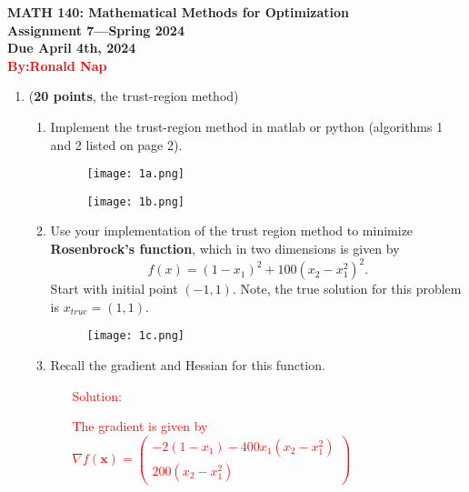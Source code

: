 \documentclass[11pt]{article}
\begin{document}
\pagestyle{empty}

\begin{center}
{\large {\bf MATH 140: Mathematical Methods for Optimization}}\\
{\bf Assignment 7---Spring 2024}\\
{\bf Due April 4th, 2024} \\
{\textcolor{red}{\bf By:Ronald Nap}}

\end{center}

\begin{enumerate}

\item ({\bf 20 points}, the trust-region method)
  \begin{enumerate}
  \item Implement the trust-region method in matlab or python
    (algorithms 1 and 2 listed on page 2).

    \begin{figure}[H]
    \centering
    \texttt{[image: 1a.png]} 
    \end{figure}
    \begin{figure}[H]
    \centering
    \texttt{[image: 1b.png]} 
    \end{figure}

    
  \item Use your implementation of the trust region method to minimize
    \textbf{Rosenbrock's function}, which in two dimensions is given by
    $$
    f(x) = (1 - x_1)^2 + 100(x_2 - x_1^2)^2.
    $$ Start with initial point $(-1,1)$. Note, the true solution for
    this problem is $x_{true} = (1, 1)$.

    \begin{figure}[H]
    \centering
    \texttt{[image: 1c.png]} 
    \end{figure}

    
  \item Recall the gradient and Hessian for this function.

    \begin{enumerate}
        \item[\textcolor{red}{Solution:}] 

            \textcolor{red}{The gradient is given by $\nabla f(\mathbf{x}) = \begin{pmatrix} -2(1 - x_1) - 400x_1(x_2 - x_1^2) \\ 200(x_2 - x_1^2) \end{pmatrix}$} \\
            

\end{enumerate}
\end{enumerate}
\end{enumerate}
\end{document}
